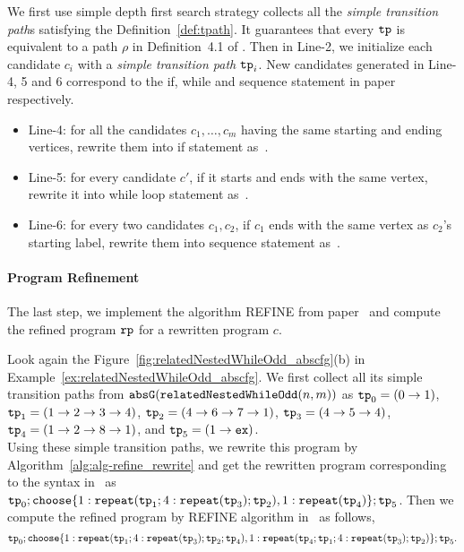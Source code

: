 We first use simple depth first search strategy collects all the \emph{simple transition path}s satisfying the Definition~\ref{def:tpath}. It guarantees that every $\mathtt{tp}$ is equivalent to a path $\rho$ in Definition~4.1 of \cite{GulwaniJK09}.
Then
in Line-2, we initialize each candidate $c_i$ with a \emph{simple transition path} $\mathtt{tp}_i$. New candidates generated in Line-4, 5 and 6 correspond to the if,
while and sequence statement in paper~\cite{GulwaniJK09} respectively.
\begin{itemize}
  \item
  Line-4: for all the candidates $c_1, \ldots, c_m$ having the same starting and ending vertices, rewrite them into if statement as~\cite{GulwaniJK09}.
  \item
  Line-5: for every candidate $c'$, if it starts and ends with the same vertex, rewrite it into while loop statement as~\cite{GulwaniJK09}.
  \item
  Line-6: for every two candidates $c_1, c_2$, if $c_1$ ends with the same vertex as $c_2$'s starting label, rewrite them into sequence statement as~\cite{GulwaniJK09}.
\end{itemize}
\paragraph{Program Refinement}
The last step, we implement the algorithm REFINE from paper~\cite{GulwaniJK09} and compute the 
refined program $\mathtt{rp}$ for a rewritten program $c$.

Look again the Figure~\ref{fig:relatedNestedWhileOdd_abscfg}(b) in Example~\ref{ex:relatedNestedWhileOdd_abscfg}.
We first collect all its simple transition paths from $\mathtt{abs}{\mathtt{G}}(\mathtt{relatedNestedWhileOdd}(n, m))$ as
$\mathtt{tp}_0 = (0 \to 1)$,
$\mathtt{tp}_1 = (1 \to 2 \to 3 \to 4)$,
$\mathtt{tp}_2 = (4 \to 6 \to 7 \to 1)$,
$\mathtt{tp}_3 = (4 \to 5 \to 4)$, $\mathtt{tp}_4 = (1 \to 2 \to 8 \to 1)$, and $\mathtt{tp}_5 = (1 \to \mathtt{ex})$.
\\ 
Using these simple transition paths, we rewrite this program by Algorithm~\ref{alg:alg-refine_rewrite} and get the rewritten program corresponding to the syntax in~\cite{GulwaniJK09} as
$ \tpath_0 ; \rpchoose{ 1: \rprepeat(\tpath_1; 4:\rprepeat(\tpath_3); \tpath_2), 
1: \rprepeat(\tpath_4) }; \tpath_5$.
Then we compute the refined program by REFINE algorithm in~\cite{GulwaniJK09} as follows,
\[
    \tpath_0 ; \rpchoose{ 1: \rprepeat(\tpath_1; 4:\rprepeat(\tpath_3); \tpath_2; \tpath_4), 
    1: \rprepeat(\tpath_4; \tpath_1; 4:\rprepeat(\tpath_3); \tpath_2) }; \tpath_5.
\]

